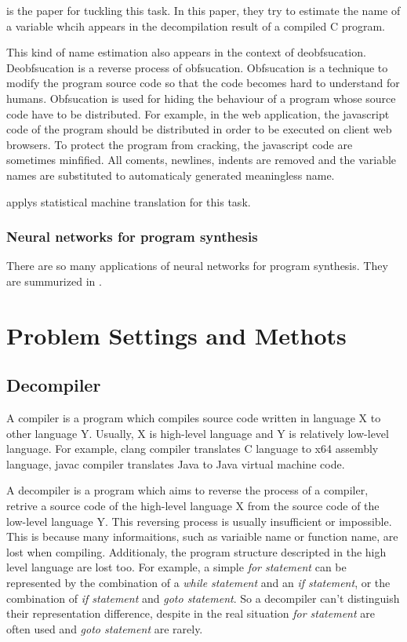 \documentclass[senior,final,11pt]{iscs-thesis}
\begin{document}
\cite{name_recover_from_decompile_result} is the paper for tuckling this task. 
In this paper, they try to estimate the name of a variable whcih appears in the decompilation result of a compiled C program.

This kind of name estimation also appears in the context of deobfsucation.
Deobfsucation is a reverse process of obfsucation.
Obfsucation is a technique to modify the program source code so that the code becomes hard to understand for humans. 
Obfsucation is used for hiding the behaviour of a program whose source code have to be distributed.
For example, in the web application, the javascript code of the program should be distributed in order to be executed on client web browsers.
To protect the program from cracking, the javascript code are sometimes minfified. All coments, newlines, indents are removed and the 
variable names are substituted to automaticaly generated meaningless name.

\cite{JSNaughty} applys statistical machine translation for this task. 

\subsection{Neural networks for program synthesis}

There are so many applications of neural networks for program synthesis. They are summurized in \cite{deep_programming_matome}.


\chapter{Problem Settings and Methots}

\section{Decompiler}


A compiler is a program which compiles source code written in language X to other language Y. 
Usually, X is high-level language and Y is relatively low-level language. 
For example, clang compiler translates C language to x64 assembly language, javac compiler translates Java to Java virtual machine code.

A decompiler is a program which aims to reverse the process of a compiler, retrive a source code of the high-level language X from the source code of the low-level language Y. 
This reversing process is usually insufficient or impossible.
This is because many informaitions, such as variaible name or function name, are lost when compiling.
Additionaly, the program structure descripted in the high level language are lost too. 
For example, a simple {\sl for statement} can be represented by the combination of a {\sl while statement} and an {\sl if statement}, or the combination of {\sl if statement} and {\sl goto statement}. 
So a decompiler can't distinguish their representation difference, despite in the real situation {\sl for statement} are often used and {\sl goto statement} are rarely. 
\end{document}
